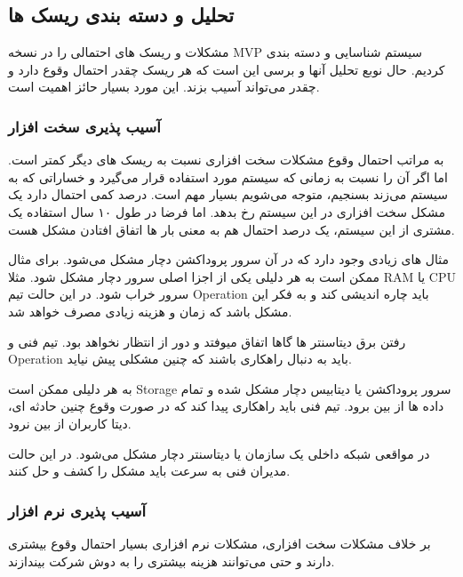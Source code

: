 \subsection{تحلیل و دسته بندی ریسک ها}
مشکلات و ریسک های احتمالی را در نسخه MVP سیستم شناسایی و دسته بندی کردیم. حال نوبع تحلیل آنها و برسی این است که هر ریسک چقدر احتمال وقوع دارد
و چقدر می‌تواند آسیب بزند. این مورد بسیار حائز اهمیت است.

\subsubsection{آسیب پذیری سخت افزار}
به مراتب احتمال وقوع مشکلات سخت افزاری نسبت به ریسک های دیگر کمتر است. اما اگر آن را نسبت به زمانی که سیستم مورد استفاده قرار می‌گیرد
و خساراتی که به سیستم می‌زند بسنجیم، متوجه می‌شویم بسیار مهم است. درصد کمی احتمال دارد یک مشکل سخت افزاری در این سیستم رخ بدهد. اما فرضا در طول ۱۰ سال
استفاده یک مشتری از این سیستم، یک درصد احتمال هم به معنی بار ها اتفاق افتادن مشکل هست.


مثال های زیادی وجود دارد که در آن سرور پروداکشن دچار مشکل می‌شود. برای مثال ممکن است به هر دلیلی یکی از اجزا اصلی سرور دچار مشکل شود.
مثلا RAM یا CPU سرور خراب شود. در این حالت تیم Operation باید چاره اندیشی کند و به فکر این مشکل باشد که زمان و هزینه زیادی مصرف خواهد شد.


رفتن برق دیتاسنتر ها گاها اتفاق میوفتد و دور از انتظار نخواهد بود. تیم فنی و Operation باید به دنبال راهکاری باشند که چنین مشکلی پیش نیاید.


به هر دلیلی ممکن است Storage سرور پروداکشن یا دیتابیس دچار مشکل شده و تمام داده ها از بین برود. تیم فنی باید راهکاری پیدا کند که در صورت وقوع چنین حادثه ای،‌
دیتا کاربران از بین نرود.


در مواقعی شبکه داخلی یک سازمان یا دیتاسنتر دچار مشکل می‌شود. در این حالت مدیران فنی به سرعت باید مشکل را کشف و حل کنند.

\subsubsection{آسیب پذیری نرم افزار}
بر خلاف مشکلات سخت افزاری، مشکلات نرم افزاری بسیار احتمال وقوع بیشتری دارند و حتی می‌توانند هزینه بیشتری را به دوش شرکت بیندازند. 

